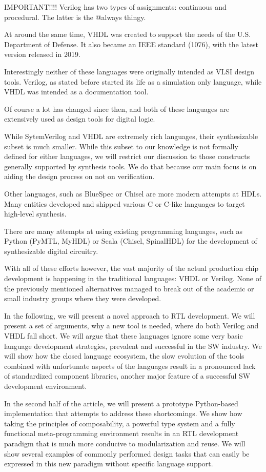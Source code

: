 \documentclass[conference,compsoc]{IEEEtran}
\begin{document}
IMPORTANT!!!!
Verilog has two types of assignments: continuous and procedural. The latter is the @always thingy.

At around the same time, VHDL was created to support the needs of the U.S. Department of Defense.
It also became an IEEE standard (1076), with the latest version released in 2019.

Interestingly neither of these languages were originally intended as VLSI design tools. Verilog,
as stated before started its life as a simulation only language, while VHDL was intended as a
documentation tool.

Of course a lot has changed since then, and both of these languages are extensively used as design
tools for digital logic.

While SytemVerilog and VHDL are extremely rich languages, their synthesizable subset is much smaller.
While this subset to our knowledge is not formally defined for either languages, we will restrict
our discussion to those constructs generally supported by synthesis tools. We do that because our
main focus is on aiding the design process on not on verification.

Other languages, such as BlueSpec or Chisel are more modern attempts at HDLs. Many entities
developed and shipped various C or C-like languages to target high-level synthesis.

There are many attempts at using existing programming languages, such as Python (PyMTL, MyHDL)
or Scala (Chisel, SpinalHDL) for the development of synthesizable digital circuitry.

With all of these efforts however, the vast majority of the actual production chip development
is happening in the traditional languages: VHDL or Verilog. None of the previously mentioned
alternatives managed to break out of the academic or small industry groups where they were developed.

In the following, we will present a novel approach to RTL development. We will present a set of
arguments, why a new tool is needed, where do both Verilog and VHDL fall short. We will argue
that these languages ignore some very basic language development strategies, prevalent
and successful in the SW industry. We will show how the closed language ecosystem, the slow
evolution of the tools combined with unfortunate aspects of the languages result in a pronounced
lack of standardized component libraries, another major feature of a successful SW development
environment.

In the second half of the article, we will present a prototype Python-based implementation that
attempts to address these shortcomings. We show how taking the principles of composability, a
powerful type system and a fully functional meta-programming environment results in an RTL
development paradigm that is much more conducive to modularization and reuse. We will show
several examples of commonly performed design tasks that can easily be expressed in this new
paradigm without specific language support.
\end{document}
